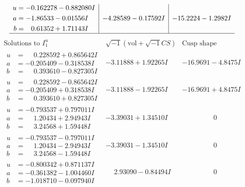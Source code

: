 \documentclass[1p]{elsarticle_modified}
\theoremstyle{definition}
\newcommand{\I}{\sqrt{-1}}
\begin{document}
$$\begin{array}{c|c|c}
\begin{aligned}
u &= -0.162278 - 0.882080 I \\
a &= -1.86533 - 0.01556 I \\
b &= \phantom{-}0.61352 + 1.71143 I\end{aligned}
 & -4.28589 - 0.17592 I & -15.2224 - 1.2982 I\\
 \hline 
 \end{array}$$\newpage$$\begin{array}{c|c|c}  
\text{Solutions to }I^u_{1}& \I (\text{vol} + \sqrt{-1}CS) & \text{Cusp shape}\\
 \hline 
\begin{aligned}
u &= \phantom{-}0.228592 + 0.865642 I \\
a &= -0.205409 - 0.318538 I \\
b &= \phantom{-}0.393610 - 0.827305 I\end{aligned}
 & -3.11888 + 1.92265 I & -16.9691 - 4.8475 I \\ \hline\begin{aligned}
u &= \phantom{-}0.228592 - 0.865642 I \\
a &= -0.205409 + 0.318538 I \\
b &= \phantom{-}0.393610 + 0.827305 I\end{aligned}
 & -3.11888 - 1.92265 I & -16.9691 + 4.8475 I \\ \hline\begin{aligned}
u &= -0.793537 + 0.797011 I \\
a &= \phantom{-}1.20434 + 2.94943 I \\
b &= \phantom{-}3.24568 + 1.59448 I\end{aligned}
 & -3.39031 + 1.34510 I & \phantom{-0.000000 } 0 \\ \hline\begin{aligned}
u &= -0.793537 - 0.797011 I \\
a &= \phantom{-}1.20434 - 2.94943 I \\
b &= \phantom{-}3.24568 - 1.59448 I\end{aligned}
 & -3.39031 - 1.34510 I & \phantom{-0.000000 } 0 \\ \hline\begin{aligned}
u &= -0.800342 + 0.871137 I \\
a &= -0.361382 - 1.004460 I \\
b &= -1.018710 - 0.097940 I\end{aligned}
 & \phantom{-}2.93090 - 0.84494 I & \phantom{-0.000000 } 0 \\ \hline\begin{aligned}

\end{aligned}
\end{array}$$
\end{document}
